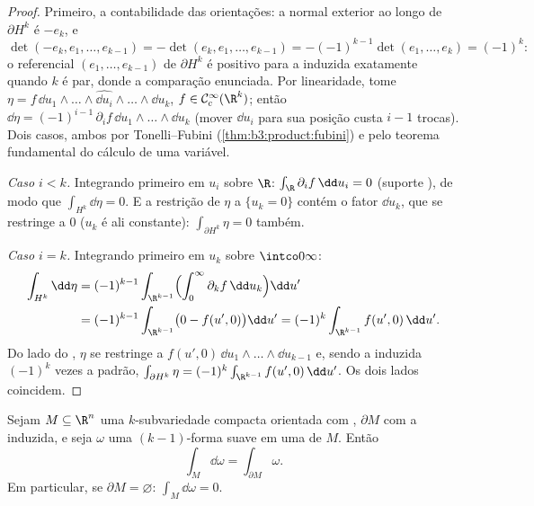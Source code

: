 \begin{proof}
Primeiro, a contabilidade das orientações: a normal exterior ao longo de
$\partial H^k$ é $-e_k$, e
\[
\det(-e_k, e_1, \dots, e_{k-1}) =
-\det(e_k, e_1, \dots, e_{k-1}) = -(-1)^{k-1}\det(e_1,
\dots, e_k) = (-1)^k :
\]
o referencial $(e_1, \dots, e_{k-1})$ de $\partial H^k$ é positivo para a  induzida
exatamente quando $k$ é par, donde a comparação enunciada. Por
linearidade, tome $\eta
= f\,\dd u_1\wedge\dots\wedge\widehat{\dd
u_i}\wedge\dots\wedge\dd u_k$, $f \in \mathcal
C^\infty_c(\R^k)$; então $\dd\eta =
(-1)^{i-1}\,\partial_if\,\dd u_1\wedge\dots\wedge\dd u_k$ (mover $\dd u_i$ para sua posição
custa $i - 1$ trocas). Dois casos, ambos por Tonelli--Fubini
(\cref{thm:b3:product:fubini}) e pelo teorema fundamental do cálculo de uma variável.

\emph{Caso $i < k$.} Integrando primeiro em $u_i$ sobre $\R$:
$\int_\R\partial_if\,\dd u_i = 0$ (suporte ), de modo que $\int_{H^k}\dd\eta = 0$. E a restrição de $\eta$
a $\{u_k = 0\}$ contém o fator $\dd u_k$, que se restringe a $0$ ($u_k$ é ali
constante): $\int_{\partial H^k}\eta =
0$ também.

\emph{Caso $i = k$.} Integrando primeiro em $u_k$ sobre $\intco0\infty$:
\begin{align*}
\int_{H^k}\dd\eta &= (-1)^{k-1}\int_{\R^{k-1}}
\Bigl(\int_0^\infty\partial_kf\,\dd u_k\Bigr)\dd u' \\
&= (-1)^{k-1}\int_{\R^{k-1}}\bigl(0 - f(u', 0)\bigr)\dd u'
= (-1)^k\int_{\R^{k-1}}f(u',0)\,\dd u' .
\end{align*}
Do lado do , $\eta$ se restringe a $f(u',
0)\,\dd u_1\wedge\dots\wedge\dd u_{k-1}$ e, sendo a 
induzida $(-1)^k$ vezes a padrão, $\int_{\partial H^k}\eta =
(-1)^k\int_{\R^{k-1}}f(u',0)\,\dd u'$. Os dois lados coincidem.
\end{proof}

\begin{theorem}[Stokes]\label{thm:b3:forms:stokes}
Sejam $M \subseteq \R^n$ uma $k$-subvariedade compacta orientada com , $\partial M$
com a  induzida, e seja $\omega$ uma $(k-1)$-forma suave
em uma  de $M$. Então
\[
\int_M\dd\omega = \int_{\partial M}\omega .
\]
Em particular, se $\partial M = \varnothing$: $\int_M\dd\omega = 0$.
\end{theorem}

